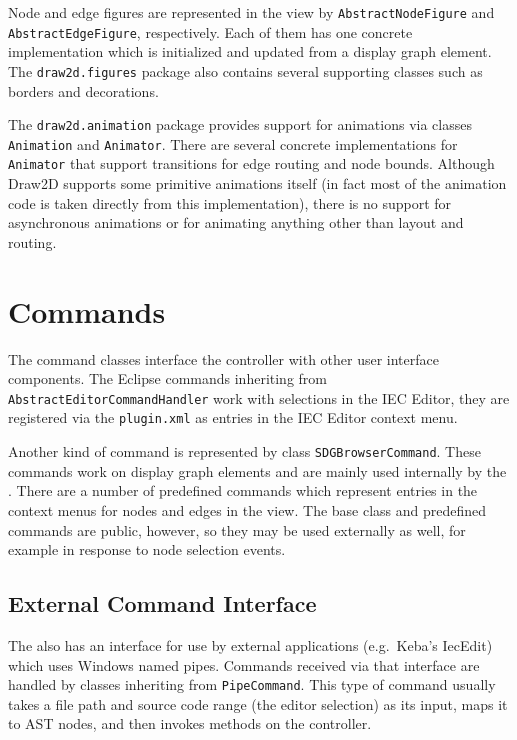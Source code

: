 Node and edge figures are represented in the view by \lstinline|AbstractNodeFigure| and \lstinline|AbstractEdgeFigure|, 
respectively. Each of them has one concrete implementation which is initialized and updated from a display graph 
element. The \lstinline|draw2d.figures| package also contains several supporting classes such as borders and 
decorations.

The \lstinline|draw2d.animation| package provides support for animations via classes \lstinline|Animation| and 
\lstinline|Animator|. There are several concrete implementations for \lstinline|Animator| that support transitions for 
edge routing and node bounds. Although Draw2D supports some primitive animations itself (in fact most of the animation 
code is taken directly from this implementation), there is no support for asynchronous animations or for animating 
anything other than layout and routing.


\section{Commands}

The command classes interface the \SB controller with other user interface components. The Eclipse commands inheriting 
from \lstinline|AbstractEditorCommandHandler| work with selections in the IEC Editor, they are registered via the \SB 
\lstinline|plugin.xml| as entries in the IEC Editor context menu.

Another kind of command is represented by class \lstinline|SDGBrowserCommand|. These commands work on display graph 
elements and are mainly used internally by the \SB. There are a number of predefined commands which represent entries 
in the context menus for nodes and edges in the \SB view. The base class and predefined commands are public, however, 
so they may be used externally as well, for example in response to node selection events.

\subsection{External Command Interface}

The \SB also has an interface for use by external applications (e.g.\ Keba's IecEdit) which uses Windows named pipes. 
Commands received via that interface are handled by classes inheriting from \lstinline|PipeCommand|. This type of 
command usually takes a file path and source code range (the editor selection) as its input, maps it to AST nodes, and 
then invokes methods on the \SB controller.

